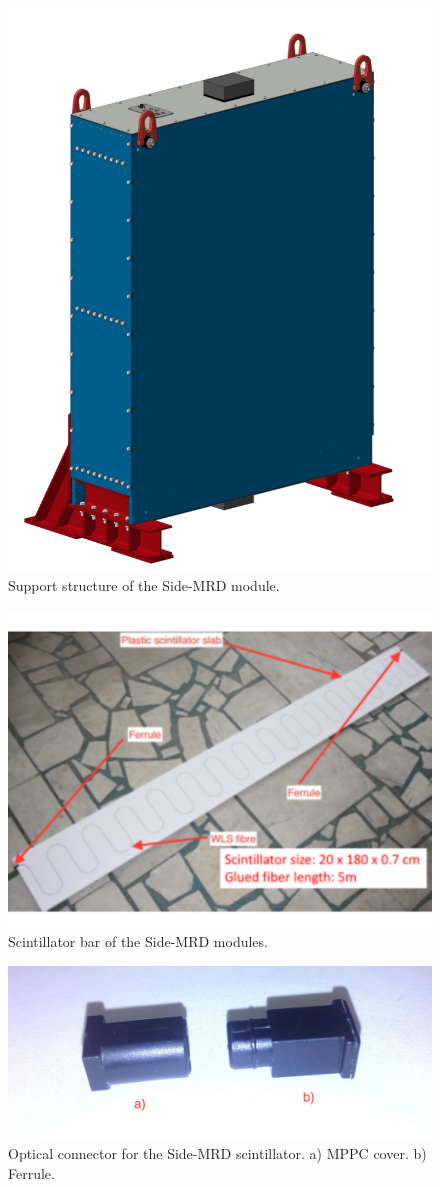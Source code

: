 \begin{figure}[tbh]
\begin{center}
\includegraphics[width=0.5\linewidth]{fig/SMRD_Module.pdf}
\end{center}
\caption{
Support structure of the Side-MRD module.
}
\label{fig:side_mrd_support_structure}
\end{figure}

\begin{figure}[tbh]
\begin{center}
\includegraphics[width=0.8\linewidth]{fig/side_mrd_scintillator.pdf}
\end{center}
\caption{
Scintillator bar of the Side-MRD modules.
}
\label{fig:side_mrd_scintillator}
\end{figure}

\begin{figure}[tbh]
\begin{center}
\includegraphics[width=0.8\linewidth]{fig/side_mrd_optical_con.pdf}
\end{center}
\caption{
Optical connector for the Side-MRD scintillator. a) MPPC cover. b) Ferrule.
}
\label{fig:side_mrd_optical_con}
\end{figure}

